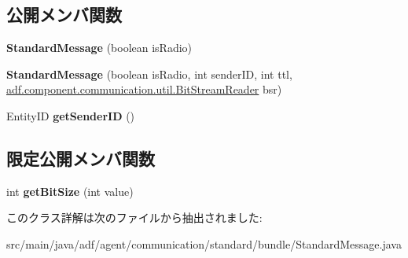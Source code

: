 \subsection*{公開メンバ関数}
\begin{DoxyCompactItemize}
\item 
\hypertarget{classadf_1_1agent_1_1communication_1_1standard_1_1bundle_1_1StandardMessage_a4e50f8d38f29b5bc973b1c48fec49922}{}\label{classadf_1_1agent_1_1communication_1_1standard_1_1bundle_1_1StandardMessage_a4e50f8d38f29b5bc973b1c48fec49922} 
{\bfseries Standard\+Message} (boolean is\+Radio)
\item 
\hypertarget{classadf_1_1agent_1_1communication_1_1standard_1_1bundle_1_1StandardMessage_a7cc9600600c85f600c4b9b52337313a3}{}\label{classadf_1_1agent_1_1communication_1_1standard_1_1bundle_1_1StandardMessage_a7cc9600600c85f600c4b9b52337313a3} 
{\bfseries Standard\+Message} (boolean is\+Radio, int sender\+ID, int ttl, \hyperlink{classadf_1_1component_1_1communication_1_1util_1_1BitStreamReader}{adf.\+component.\+communication.\+util.\+Bit\+Stream\+Reader} bsr)
\item 
\hypertarget{classadf_1_1agent_1_1communication_1_1standard_1_1bundle_1_1StandardMessage_aa9a0ef1976869b50f0b0cda1e93b2666}{}\label{classadf_1_1agent_1_1communication_1_1standard_1_1bundle_1_1StandardMessage_aa9a0ef1976869b50f0b0cda1e93b2666} 
Entity\+ID {\bfseries get\+Sender\+ID} ()
\end{DoxyCompactItemize}
\subsection*{限定公開メンバ関数}
\begin{DoxyCompactItemize}
\item 
\hypertarget{classadf_1_1agent_1_1communication_1_1standard_1_1bundle_1_1StandardMessage_a159c1d41eaddb08cec8f54465c3d33c4}{}\label{classadf_1_1agent_1_1communication_1_1standard_1_1bundle_1_1StandardMessage_a159c1d41eaddb08cec8f54465c3d33c4} 
int {\bfseries get\+Bit\+Size} (int value)
\end{DoxyCompactItemize}


このクラス詳解は次のファイルから抽出されました\+:\begin{DoxyCompactItemize}
\item 
src/main/java/adf/agent/communication/standard/bundle/Standard\+Message.\+java\end{DoxyCompactItemize}
